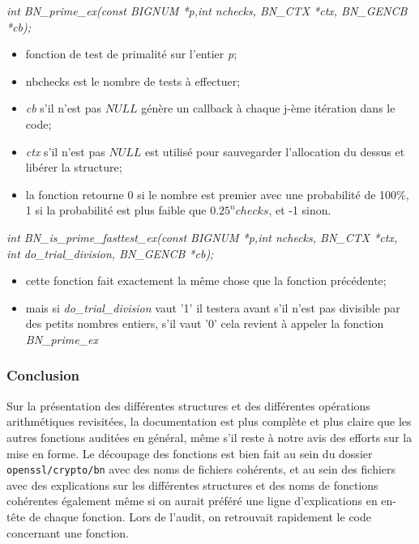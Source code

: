 			\textit{int BN\_prime\_ex(const BIGNUM *p,int nchecks, BN\_CTX *ctx, BN\_GENCB *cb);} 
			\begin{itemize}
			\item fonction de test de primalité sur l'entier \textit{p};
			\item nbchecks est le nombre de tests à effectuer;
			\item \textit{cb} s'il n'est pas $NULL$ génère un callback à chaque j-ème itération dans le code;
			\item \textit{ctx} s'il n'est pas $NULL$ est utilisé pour sauvegarder l'allocation du dessus et libérer la structure;
			\item la fonction retourne 0 si le nombre est premier avec une probabilité de 100\%, 1 si la probabilité est plus faible que $0.25^nchecks$, et -1 sinon.\\
			\end{itemize}

			\textit{int BN\_is\_prime\_fasttest\_ex(const BIGNUM *p,int nchecks, BN\_CTX *ctx, int do\_trial\_division, BN\_GENCB *cb);} 
			\begin{itemize}
			\item cette fonction fait exactement la même chose que la fonction précédente;
			\item mais si \textit{do\_trial\_division} vaut '1' il testera avant s'il n'est pas divisible par des petits nombres entiers, s'il vaut '0' cela revient à appeler la fonction \textit{BN\_prime\_ex}
			\end{itemize}

		\subsubsection{Conclusion}

			Sur la présentation des différentes structures et des différentes opérations arithmétiques revisitées, la documentation est plus complète et plus claire que les autres fonctions auditées en général, même s'il reste à notre avis des efforts sur la mise en forme. Le découpage des fonctions est bien fait au sein du dossier \texttt{openssl/crypto/bn} avec des noms de fichiers cohérents, et au sein des fichiers avec des explications sur les différentes structures et des noms de fonctions cohérentes également même si on aurait préféré une ligne d'explications en en-tête de chaque fonction. Lors de l'audit, on retrouvait rapidement le code concernant une fonction.\\
			

